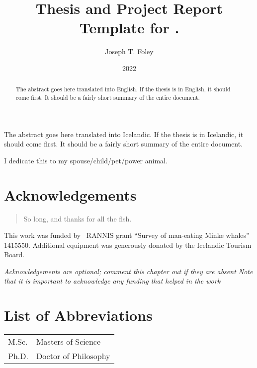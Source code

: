 \documentclass[12pt,a4paper,titlepage,online]{memoir}
\title{Thesis and Project Report Template for \theInstitution{}.}
\author{Joseph T. Foley}%
\date{2022}{2}{2}%
\begin{document}
\maketitle{}
\copyrightpage{}
\signaturepage{}
\archivesigpage{}

\begin{abstract}
  The abstract goes here translated into English.
  If the thesis is in English, it should come first.
  It should be a fairly short summary of the entire document.
\end{abstract}

\begin{abstractIS}
  The abstract goes here translated into Icelandic.
  If the thesis is in Icelandic, it should come first.
  It should be a fairly short summary of the entire document.
\end{abstractIS}

\begin{dedications}
  I dedicate this to my spouse/child/pet/power animal.
\end{dedications}

\enableindents{}%

\chapter*{Acknowledgements} 
\begin{quotation}
So long, and thanks for all the fish.
\end{quotation}
\vspace{\baselineskip}

This work was funded by \the\year~RANNIS grant ``Survey of man-eating Minke whales'' 1415550.
Additional equipment was generously donated by the Icelandic Tourism Board.

{\em Acknowledgements are optional; comment this chapter out if they are absent
  Note that it is important to acknowledge any funding that helped in the work\/}
\clearpage{}
\tableofcontents{}\clearpage
\listoffigures{}\clearpage
\listoftables{}\clearpage

\chapter*{List of Abbreviations}%
\begin{tabular}{ll}
M.Sc. &Masters of Science\\
Ph.D. &Doctor of Philosophy\\
\end{tabular}
\end{document}
